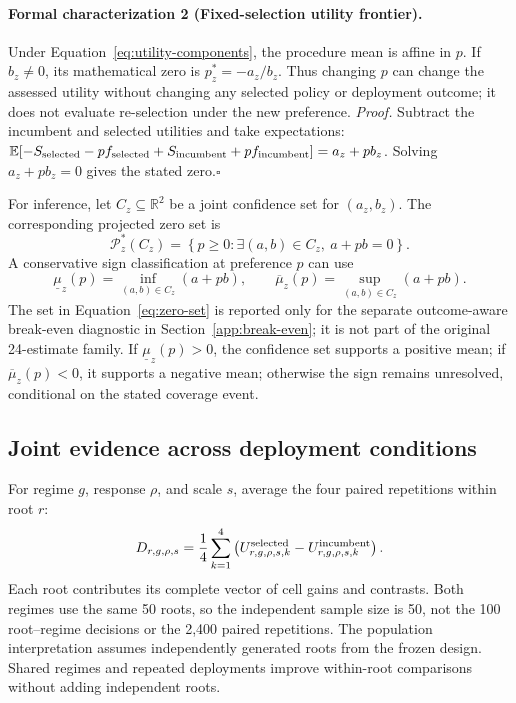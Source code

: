 \documentclass[10pt,letterpaper]{article}
\newcommand{\E}{\mathbb{E}}
\begin{document}
\paragraph{Formal characterization 2 (Fixed-selection utility frontier).}
Under Equation~\ref{eq:utility-components}, the procedure mean is affine in $p$. If $b_z\ne0$, its mathematical zero is $p_z^*=-a_z/b_z$. Thus changing $p$ can change the assessed utility without changing any selected policy or deployment outcome; it does not evaluate re-selection under the new preference. \emph{Proof.} Subtract the incumbent and selected utilities and take expectations: $\E[-S_{\rm selected}-pf_{\rm selected}+S_{\rm incumbent}+pf_{\rm incumbent}]=a_z+p b_z$. Solving $a_z+p b_z=0$ gives the stated zero.\hfill$\square$

For inference, let $C_z\subseteq\mathbb R^2$ be a joint confidence set for $(a_z,b_z)$. The corresponding projected zero set is
\begin{equation}
\mathcal P_z^*(C_z)=\left\{p\geq0:\exists(a,b)\in C_z,\ a+pb=0\right\}.
\label{eq:zero-set}
\end{equation}
A conservative sign classification at preference $p$ can use
\begin{equation}
\underline\mu_z(p)=\inf_{(a,b)\in C_z}(a+pb), \qquad
\overline\mu_z(p)=\sup_{(a,b)\in C_z}(a+pb).
\label{eq:utility-support}
\end{equation}
The set in Equation~\ref{eq:zero-set} is reported only for the separate outcome-aware break-even diagnostic in Section~\ref{app:break-even}; it is not part of the original 24-estimate family. If $\underline\mu_z(p)>0$, the confidence set supports a positive mean; if $\overline\mu_z(p)<0$, it supports a negative mean; otherwise the sign remains unresolved, conditional on the stated coverage event.

\subsection{Joint evidence across deployment conditions}
For regime $g$, response $\rho$, and scale $s$, average the four paired repetitions within root $r$:
\begin{equation}
D_{r,g,\rho,s}=\frac14\sum_{k=1}^4
\left(U_{r,g,\rho,s,k}^{\rm selected}-U_{r,g,\rho,s,k}^{\rm incumbent}\right).
\end{equation}
Each root contributes its complete vector of cell gains and contrasts. Both regimes use the same 50 roots, so the independent sample size is 50, not the 100 root--regime decisions or the 2,400 paired repetitions. The population interpretation assumes independently generated roots from the frozen design. Shared regimes and repeated deployments improve within-root comparisons without adding independent roots.
\end{document}
